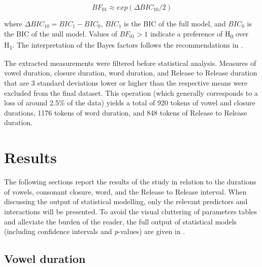 \documentclass[preprint]{JASAnew}
\begin{document}
\begin{equation}
\label{eq:bayes}
BF_{01} \approx exp(\Delta{}BIC_{10}/2)
\end{equation}

where \(\Delta{}BIC_{10} = BIC_1 - BIC_0\), \(BIC_1\) is the BIC of the
full model, and \(BIC_0\) is the BIC of the null model. Values of
\(BF_{01} > 1\) indicate a preference of H\textsubscript{0} over
H\textsubscript{1}. The interpretation of the Bayes factors follows the
recommendations in \citet[p.~139]{raftery1995}.

The extracted measurements were filtered before statistical analysis.
Measures of vowel duration, closure duration, word duration, and Release
to Release duration that are 3 standard deviations lower or higher than
the respective means were excluded from the final dataset. This
operation (which generally corresponds to a loss of around 2.5\% of the
data) yields a total of 920 tokens of vowel and closure durations, 1176
tokens of word duration, and 848 tokens of Release to Release duration.

\hypertarget{results}{%
\section{Results}\label{results}}

The following sections report the results of the study in relation to
the durations of vowels, consonant closure, word, and the Release to
Release interval. When discussing the output of statistical modelling,
only the relevant predictors and interactions will be presented. To
avoid the visual cluttering of parameters tables and alleviate the
burden of the reader, the full output of statistical models (including
confidence intervals and \emph{p}-values) are given in .

\hypertarget{vowel-duration}{%
\subsection{Vowel duration}\label{vowel-duration}}
\end{document}
